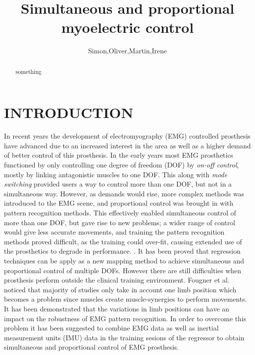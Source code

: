 \documentclass[a4paper, 10pt, conference]{ieeeconf}      %
\title{\LARGE \bf
	Simultaneous and proportional myoelectric control
}%
\author{Simon,Oliver,Martin,Irene}%
\begin{document}
	
	
	
	\maketitle
	\thispagestyle{empty}
	\pagestyle{empty}
	
	
	\begin{abstract}
		
	something
		
	\end{abstract}
	
	
	\section{INTRODUCTION}
In recent years the development of electromyography (EMG) controlled prosthesis have advanced due to an increased interest in the area as well as a higher demand of better control of this prosthesis.\cite{fougner2012}
In the early years most EMG prosthetics functioned by only controlling one degree of freedom (DOF) by \textit{on-off control}, mostly by linking antagonistic muscles to one DOF. This along with \textit{mode switching} provided users a way to control more than one DOF, but not in a simultaneous way. However, as demands would rise, more complex methods was introduced to the EMG scene, and proportional control was brought in with pattern recognition methods. This effectively enabled simultaneous control of more than one DOF, but gave rise to new problems; a wider range of control would give less accurate movements, and training the pattern recognition methods proved difficult, as the training could over-fit, causing extended use of the prosthetics to degrade in performance. \cite{Ison2016}. It has been proved that regression techniques can be apply as a new mapping method to achieve simultaneous and proportional control of multiple DOFs\cite{hanhe2014}. However there are still difficulties when prosthesis perform outside the clinical training environment\cite{jiang2012}. Fougner et al.\cite{Fougner2011} noticed that majority of studies only take in account one limb position which becomes a problem since muscles create muscle-synergies to perform movements. It has been demonstrated that the variations in limb positions can have an impact on the robustness of EMG pattern recognition. In order to overcome this problem it has been suggested to combine EMG data as well as inertial measurement units (IMU) data in the training sesions of the regressor to obtain simultaneous and proportional control of EMG prosthesis.
\end{document}
